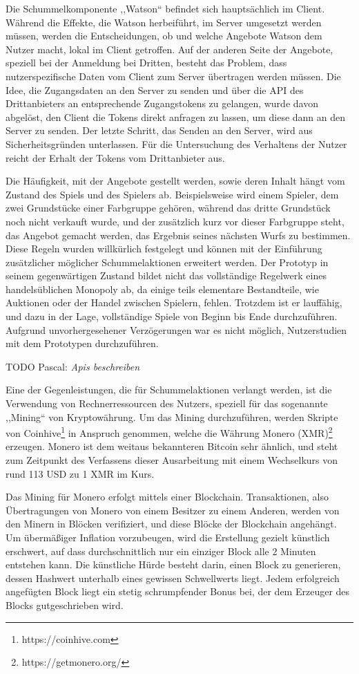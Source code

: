\documentclass[german]{cgspaper} %
\newcommand{\todo}[1]{\textit{#1}}
\newcommand{\Pascal}[1]{\textcolor{colorPascal}{TODO Pascal:} \todo{#1} }
\begin{document}
Die Schummelkomponente ,,Watson`` befindet sich hauptsächlich im Client.
Während die Effekte, die Watson herbeiführt, im Server umgesetzt werden müssen, werden die Entscheidungen, ob und welche Angebote Watson dem Nutzer macht, lokal im Client getroffen.
Auf der anderen Seite der Angebote, speziell bei der Anmeldung bei Dritten, besteht das Problem, dass nutzerspezifische Daten vom Client zum Server übertragen werden müssen.
Die Idee, die Zugangsdaten an den Server zu senden und über die API des Drittanbieters an entsprechende Zugangstokens zu gelangen, wurde davon abgelöst, den Client die Tokens direkt anfragen zu lassen, um diese dann an den Server zu senden.
Der letzte Schritt, das Senden an den Server, wird aus Sicherheitsgründen unterlassen. Für die Untersuchung des Verhaltens der Nutzer reicht der Erhalt der Tokens vom Drittanbieter aus.

Die Häufigkeit, mit der Angebote gestellt werden, sowie deren Inhalt hängt vom Zustand des Spiels und des Spielers ab.
Beispielsweise wird einem Spieler, dem zwei Grundstücke einer Farbgruppe gehören, während das dritte Grundstück noch nicht verkauft wurde, und der zusätzlich kurz vor dieser Farbgruppe steht, das Angebot gemacht werden, das Ergebnis seines nächsten Wurfs zu bestimmen.
Diese Regeln wurden willkürlich festgelegt und können mit der Einführung zusätzlicher möglicher Schummelaktionen erweitert werden.
Der Prototyp in seinem gegenwärtigen Zustand bildet nicht das vollständige Regelwerk eines handelsüblichen Monopoly ab, da einige teils elementare Bestandteile, wie Auktionen oder der Handel zwischen Spielern, fehlen.
Trotzdem ist er lauffähig, und dazu in der Lage, vollständige Spiele von Beginn bis Ende durchzuführen.
Aufgrund unvorhergesehener Verzögerungen war es nicht möglich, Nutzerstudien mit dem Prototypen durchzuführen.

\Pascal{Apis beschreiben}

Eine der Gegenleistungen, die für Schummelaktionen verlangt werden, ist die Verwendung von Rechnerressourcen des Nutzers, speziell für das sogenannte ,,Mining`` von Kryptowährung.
Um das Mining durchzuführen, werden Skripte von Coinhive\footnote{https://coinhive.com} in Anspruch genommen, welche die Währung Monero (XMR)\footnote{https://getmonero.org/} erzeugen.
Monero ist dem weitaus bekannteren Bitcoin sehr ähnlich, und steht zum Zeitpunkt des Verfassens dieser Ausarbeitung mit einem Wechselkurs von rund 113 USD zu 1 XMR im Kurs.

Das Mining für Monero erfolgt mittels einer Blockchain. Transaktionen, also Übertragungen von Monero von einem Besitzer zu einem Anderen, werden von den Minern in Blöcken verifiziert, und diese Blöcke der Blockchain angehängt.
Um übermäßiger Inflation vorzubeugen, wird die Erstellung gezielt künstlich erschwert, auf dass durchschnittlich nur ein einziger Block alle 2 Minuten entstehen kann.
Die künstliche Hürde besteht darin, einen Block zu generieren, dessen Hashwert unterhalb eines gewissen Schwellwerts liegt.
Jedem erfolgreich angefügten Block liegt ein stetig schrumpfender Bonus bei, der dem Erzeuger des Blocks gutgeschrieben wird.
\end{document}
